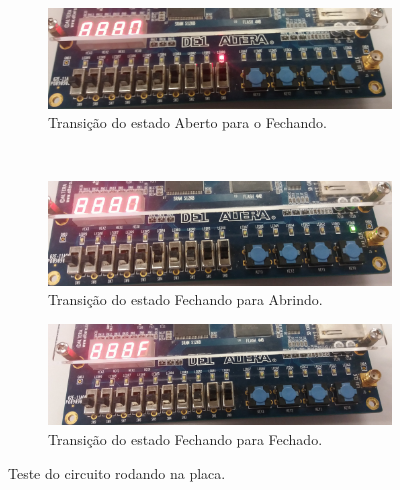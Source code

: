 \begin{figure}[H]
		\begin{subfigure}[b]{0.44\textwidth}
			\includegraphics[width=\textwidth]{img/maquina/placa/Aberto-Fechando}
			\caption{Transição do estado Aberto para o Fechando.}
		\end{subfigure}
		~
		\begin{subfigure}[b]{0.44\textwidth}
			\includegraphics[width=\textwidth]{img/maquina/placa/Fechando-Abrindo}
			\caption{Transição do estado Fechando para Abrindo.}
		\end{subfigure}

		\begin{subfigure}[b]{0.44\textwidth}
			\includegraphics[width=\textwidth]{img/maquina/placa/Fechando-Fechado}
			\caption{Transição do estado Fechando para Fechado.}
		\end{subfigure}

		\caption{Teste do circuito rodando na placa.}\label{figura:deployMaquina}
	\end{figure}

